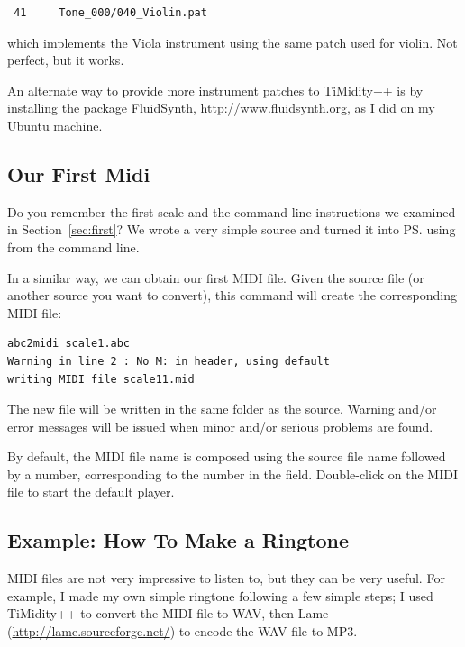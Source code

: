 \documentclass[a4paper,fullpage,12pt]{book}
\begin{document}
\begin{verbatim}
 41     Tone_000/040_Violin.pat 
\end{verbatim}

which implements the Viola instrument using the same patch used for
violin. Not perfect, but it works.

An alternate way to provide more instrument patches to TiMidity++ is
by installing the package FluidSynth, \url{http://www.fluidsynth.org},
as I did on my Ubuntu machine.


\subsection{Our First Midi}
\label{sec:firstmidi}

Do you remember the first scale and the command-line instructions we
examined in Section~\ref{sec:first}? We wrote a very simple \ABC{}
source and turned it into \ps{} using \abcm{} from the command line.

In a similar way, we can obtain our first MIDI file. Given the source
file  (or another source you want to convert), this
command will create the corresponding MIDI file:

\begin{verbatim}
abc2midi scale1.abc
Warning in line 2 : No M: in header, using default
writing MIDI file scale11.mid
\end{verbatim}

The new file  will be written in the same folder as
the source. Warning and/or error messages will be issued when minor
and/or serious problems are found.

By default, the MIDI file name is composed using the source file name
followed by a number, corresponding to the number in the 
field. Double-click on the MIDI file to start the default player.


\subsection{Example: How To Make a Ringtone}
\label{sec:ringtone}

MIDI files are not very impressive to listen to, but they can be very
useful. For example, I made my own simple ringtone following a few
simple steps; I used TiMidity++ to convert the MIDI file to WAV, then
Lame (\url{http://lame.sourceforge.net/}) to encode the WAV file to
MP3.
\end{document}
